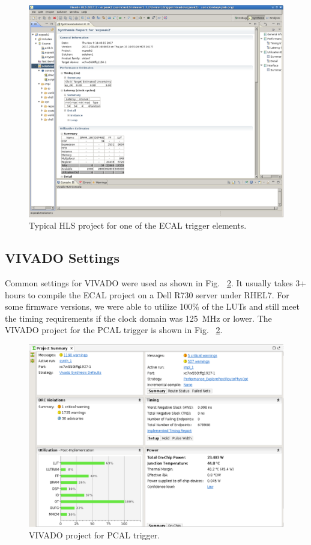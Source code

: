 \begin{figure}[hbt]
	\centering
	\includegraphics[width=1.0\columnwidth,keepaspectratio]{img/hls.png}
	\caption{Typical HLS project for one of the ECAL trigger elements.}
	\label{fig:hls}
\end{figure}

\subsection{VIVADO Settings}

Common settings for VIVADO were used as shown in Fig. ~\ref{fig:vivado}. It usually takes 3+ hours to compile the ECAL  project on a Dell R730 server under RHEL7. For some firmware versions, we were able to utilize 100\% of the LUTs and still meet the timing requirements if the clock domain was 125~MHz or lower. The VIVADO project for the PCAL trigger is shown in Fig. ~\ref{fig:vivado}.

\begin{figure}[hbt]
	\centering
	\includegraphics[width=1.0\columnwidth,keepaspectratio]{img/vivado.png}
	\caption{VIVADO project for PCAL trigger.}
	\label{fig:vivado}
\end{figure}

